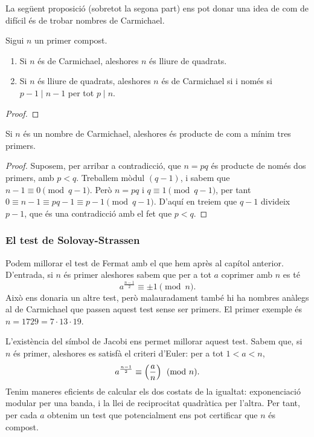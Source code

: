  La següent proposició (sobretot la segona part) ens pot donar una idea de com de difícil és de trobar nombres de Carmichael.
 \begin{proposition}
  Sigui $n$ un primer compost.
  \begin{enumerate}
      \item Si $n$ és de Carmichael, aleshores $n$ és lliure de quadrats.
      \item Si $n$ és lliure de quadrats, aleshores $n$ és de Carmichael si i només si $p-1\mid n-1$ per tot $p\mid n$.
  \end{enumerate}
 \end{proposition}
 \begin{proof}
 \end{proof}
 
 \begin{corollary}
 Si $n$ és un nombre de Carmichael, aleshores és producte de com a mínim tres primers.
 \end{corollary}
 \begin{proof}
 Suposem, per arribar a contradicció, que $n=pq$ és producte de només dos primers, amb $p<q$. Treballem mòdul $(q-1)$, i sabem que $n-1 \equiv 0\pmod{q-1}$. Però $n=pq$ i $q\equiv 1\pmod{q-1}$, per tant $0\equiv n-1\equiv pq-1\equiv p-1\pmod{q-1}$. D'aquí en treiem que $q-1$ divideix $p-1$, que és una contradicció amb el fet que $p < q$.
 \end{proof}
\subsubsection{El test de Solovay-Strassen}
Podem millorar el test de Fermat amb el que hem après al capítol anterior. D'entrada, si $n$ és primer aleshores sabem que per a tot $a$ coprimer amb $n$ es té \[
a^\frac{n-1}{2} \equiv \pm 1 \pmod n.
\]
Això ens donaria un altre test, però malauradament també hi ha nombres anàlegs al de Carmichael que passen aquest test sense ser primers. El primer exemple és $n=1729=7\cdot 13\cdot 19$.

L'existència del símbol de Jacobi ens permet millorar aquest test. Sabem que, si $n$ és primer, aleshores es satisfà el criteri d'Euler: per a tot $1< a < n$,
\begin{equation}
\label{eq:eulerwitness}
a^\frac{n-1}{2} \equiv \left(\frac{a}{n}\right) \pmod n.
\end{equation}
Tenim maneres eficients de calcular els dos costats de la igualtat: exponenciació modular per una banda, i  la llei de reciprocitat quadràtica per l'altra. Per tant, per cada $a$ obtenim un test que potencialment ens pot certificar que $n$ és compost.

